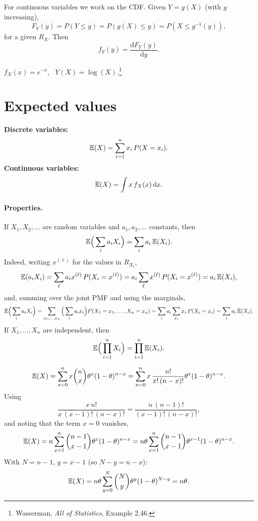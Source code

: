 For continuous variables we work on the CDF. Given $Y = g(X)$ (with $g$ increasing),
\[
F_Y(y) = P(Y \le y) = P(g(X) \le y) = P(X \le g^{-1}(y)),
\]
for a given $R_X$. Then
\[
f_Y(y) = \frac{\mathrm{d}F_Y(y)}{\mathrm{d}y}.
\]
\begin{exercise}
$f_X(x) = e^{-x}$, \ $Y(X) = \log(X)$.\footnote{Wasserman, \emph{All of Statistics}, Example 2.46.}
\end{exercise}

\section{Expected values}

\begin{definition}
\textbf{Discrete variables:}
\[
\mathbb{E}(X) = \sum_{i=1}^{n} x_i\,P(X = x_i).
\]
\textbf{Continuous variables:}
\[
\mathbb{E}(X) = \int x\,f_X(x)\,\mathrm{d} x.
\]
\end{definition}

\paragraph{Properties.}
If $X_1, X_2, \dots$ are random variables and $a_1, a_2, \dots$ constants, then
\[
\mathbb{E}\Big(\sum_i a_i X_i\Big) = \sum_i a_i\,\mathbb{E}(X_i).
\]
Indeed, writing $x^{(\ell)}$ for the values in $R_{X_i}$,
\[
\mathbb{E}(a_i X_i) = \sum_{\ell} a_i x^{(\ell)}\,P(X_i = x^{(\ell)}) = a_i\sum_{\ell} x^{(\ell)}\,P(X_i = x^{(\ell)}) = a_i\,\mathbb{E}(X_i),
\]
and, summing over the joint PMF and using the marginals,
\[
\mathbb{E}\Big(\sum_i a_i X_i\Big) = \sum_{x_1,\dots,x_n}\Big(\sum_i a_i x_i\Big)P(X_1 = x_1, \dots, X_n = x_n)
= \sum_i a_i\sum_{x_i} x_i\,P(X_i = x_i) = \sum_i a_i\,\mathbb{E}(X_i).
\]
If $X_1, \dots, X_n$ are independent, then
\[
\mathbb{E}\Big(\prod_{i=1}^{n} X_i\Big) = \prod_{i=1}^{n}\mathbb{E}(X_i).
\]

\begin{example}[Binomial]
\[
\mathbb{E}(X) = \sum_{x=0}^{n} x\binom{n}{x}\theta^{x}(1-\theta)^{n-x} = \sum_{x=0}^{n} x\,\frac{n!}{x!\,(n-x)!}\theta^{x}(1-\theta)^{n-x}.
\]
Using
\[
\frac{x\,n!}{x\,(x-1)!\,(n-x)!} = \frac{n\,(n-1)!}{(x-1)!\,(n-x)!},
\]
and noting that the term $x = 0$ vanishes,
\[
\mathbb{E}(X) = n\sum_{x=1}^{n}\binom{n-1}{x-1}\theta^{x}(1-\theta)^{n-x} = n\theta\sum_{x=1}^{n}\binom{n-1}{x-1}\theta^{x-1}(1-\theta)^{n-x}.
\]
With $N = n-1$, $y = x-1$ (so $N - y = n - x$):
\[
\mathbb{E}(X) = n\theta\sum_{y=0}^{N}\binom{N}{y}\theta^{y}(1-\theta)^{N-y} = n\theta.
\]
\end{example}

